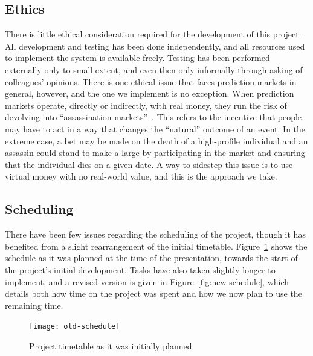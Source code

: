 \documentclass[10pt,a4paper]{article}
\theoremstyle{plain}
\theoremstyle{definition}
\begin{document}
\subsection{Ethics}

There is little ethical consideration required for the development of this
project. All development and testing has been done independently, and all
resources used to implement the system is available freely. Testing has been
performed externally only to small extent, and even then only informally
through asking of colleagues' opinions. There is one ethical issue that faces
prediction markets in general, however, and the one we implement is no
exception. When prediction markets operate, directly or indirectly, with real
money, they run the risk of devolving into ``assassination
markets''~\cite{assassinationMarkets, crowdfundingMurder}. This refers to the
incentive that people may have to act in a way that changes the ``natural''
outcome of an event. In the extreme case, a bet may be made on the death of a
high-profile individual and an assassin could stand to make a large by
participating in the market and ensuring that the individual dies on a given
date. A way to sidestep this issue is to use virtual money with no real-world
value, and this is the approach we take.

\subsection{Scheduling}

There have been few issues regarding the scheduling of the project, though it
has benefited from a slight rearrangement of the initial timetable.
Figure~\ref{fig:old-schedule} shows the schedule as it was planned at the time
of the presentation, towards the start of the project's initial development.
Tasks have also taken slightly longer to implement, and a revised version is
given in Figure~\ref{fig:new-schedule}, which details both how time on the
project was spent and how we now plan to use the remaining time.

\begin{figure}[h]
	\centering
	\texttt{[image: old-schedule]}
	\caption{Project timetable as it was initially planned}
	\label{fig:old-schedule}
\end{figure}
\end{document}
